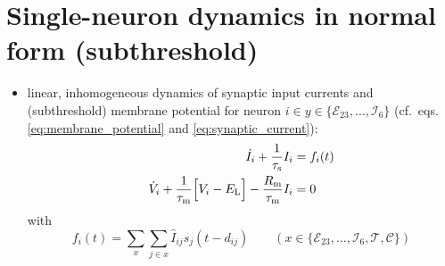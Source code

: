 \documentclass[10pt,a4paper,twoside,american]{article}
\theoremstyle{definitionstyle}
\newcommand{\RM}{R_\text{m}}
\newcommand{\tauM}{\tau_\text{m}}
\newcommand{\tauS}{\tau_\text{s}}
\begin{document}
\section{Single-neuron dynamics in normal form (subthreshold)}
\label{sec:normal_form}
\begin{itemize}
\item linear, inhomogeneous dynamics of synaptic input currents and (subthreshold) membrane potential for neuron $i \in y\in\{\mathcal{E}_{23},\ldots,\mathcal{I}_{6}\}$ (cf.~eqs.\,\eqref{eq:membrane_potential} and \eqref{eq:synaptic_current}):
  \begin{equation}
    \label{eq:1st_order_ode}
    \begin{aligned}
      \dot{I}_{i} + \frac{1}{\tauS} I_{i} &= f_{i}(t)\\
      \dot{V}_{i} + \frac{1}{\tauM} \Bigl[ V_{i}-E_\text{L}\Bigr] - \frac{\RM}{\tauM} I_{i} &= 0
    \end{aligned}
  \end{equation}
  with
  \begin{equation}
	  f_{i}(t)=\sum_{x}\sum_{j\in x} \hat{I}_{ij} s_{j}(t-d_{ij})
    \qquad(x\in\{\mathcal{E}_{23},\ldots,\mathcal{I}_{6}, \mathcal{T}, \mathcal{C}\})
  \end{equation}


\end{itemize}
\end{document}
